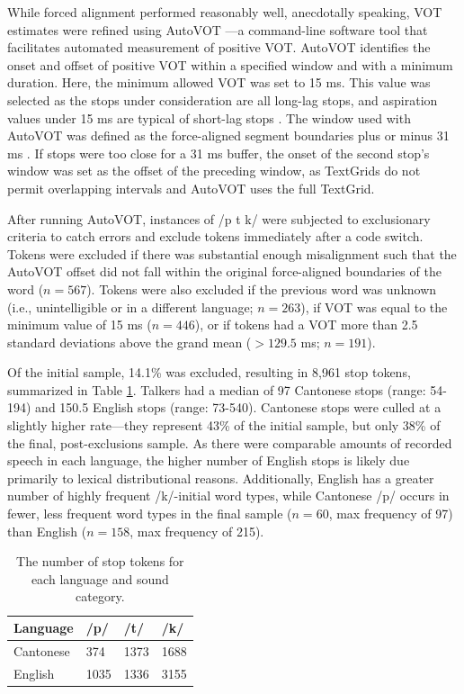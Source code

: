 While forced alignment performed reasonably well, anecdotally speaking, VOT estimates were refined using AutoVOT \citep{keshet_2014_autovot}---a command-line software tool that facilitates automated measurement of positive VOT. AutoVOT identifies the onset and offset of positive VOT within a specified window and with a minimum duration. Here, the minimum allowed VOT was set to 15 ms. This value was selected as the stops under consideration are all long-lag stops, and aspiration values under 15 ms are typical of short-lag stops \citep{lieberman_1988_speech}. The window used with AutoVOT was defined as the force-aligned segment boundaries plus or minus 31 ms \citep[as in][]{chodroff_2017_structure}. If stops were too close for a 31 ms buffer, the onset of the second stop's window was set as the offset of the preceding window, as TextGrids do not permit overlapping intervals and AutoVOT uses the full TextGrid.  

After running AutoVOT, instances of /p t k/ were subjected to exclusionary criteria to catch errors and exclude tokens immediately after a code switch. Tokens were excluded if there was substantial enough misalignment such that the AutoVOT offset did not fall within the original force-aligned boundaries of the word ($n=567$). Tokens were also excluded if the previous word was unknown (i.e., unintelligible or in a different language; $n=263$), if VOT was equal to the minimum value of 15 ms ($n=446$), or if tokens had a VOT more than 2.5 standard deviations above the grand mean ($>129.5$ ms; $n=191$).

Of the initial sample, 14.1\% was excluded, resulting in 8,961 stop tokens, summarized in Table \ref{ch3:tab:counts}. Talkers had a median of 97 Cantonese stops (range: 54-194) and 150.5 English stops (range: 73-540). Cantonese stops were culled at a slightly higher rate---they represent 43\% of the initial sample, but only 38\% of the final, post-exclusions sample. As there were comparable amounts of recorded speech in each language, the higher number of English stops is likely due primarily to lexical distributional reasons. Additionally, English has a greater number of highly frequent /k/-initial word types, while Cantonese /p/ occurs in fewer, less frequent word types in the final sample ($n=60$, max frequency of 97) than English ($n=158$, max frequency of 215).

\begin{table}[htb]
  \caption{The number of stop tokens for each language and sound category.}
  \label{ch3:tab:counts}
  \centering
  \begin{tabular}{llll}
    \toprule
    \textbf{Language}  & \textbf{/p/} & \textbf{/t/} & \textbf{/k/} \\
    \midrule
    Cantonese & 374          & 1373         & 1688   \\
    English   & 1035         & 1336         & 3155   \\
    \bottomrule     
  \end{tabular}
\end{table}



